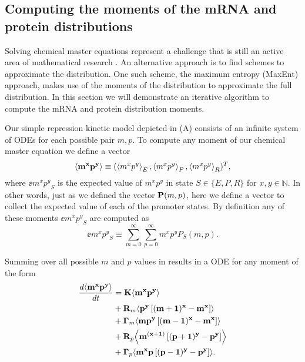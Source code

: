 \subsection{Computing the moments of the mRNA and protein distributions}
\label{sec_moments}

Solving chemical master equations represent a challenge that is still an active
area of mathematical research \cite{Dinh2016}. An alternative approach is to
find schemes to approximate the distribution. One such scheme, the maximum
entropy (MaxEnt) approach, makes use of the moments of the distribution to
approximate the full distribution. In this section we will demonstrate an
iterative algorithm to compute the mRNA and protein distribution moments.

Our simple repression kinetic model depicted in (A)
consists of an infinite system of ODEs for each possible pair $m, p$. To
compute any moment of our chemical master equation we define a vector
\begin{equation}
	\left\langle \mathbf{m^x p^y} \right\rangle \equiv (\left\langle m^x p^y \right\rangle_E, \left\langle m^x p^y \right\rangle_P, \left\langle m^x p^y \right\rangle_R)^T,
\end{equation}
where $\ee{m^x p^y}_S$ is the expected value of $m^x p^y$ in state $S \in \{E,
P, R\}$ for $x, y \in \mathbb{N}$. In other words, just as we defined the vector
$\mathbf{P}(m, p)$, here we define a vector to collect the expected value of each of
the promoter states. By definition any of these moments $\ee{m^x p^y}_S$ are
computed as
\begin{equation}
  \ee{m^x p^y}_S \equiv \sum_{m=0}^\infty \sum_{p=0}^\infty m^x p^y P_S(m, p).
  \label{eq_mom_def}
\end{equation}

Summing over all possible $m$ and $p$ values in  results in
a ODE for any moment of the form 
\begin{equation}
  \begin{aligned}
    {d{\mathbf{\left\langle m^x p^y \right\rangle}} \over dt} &=
    \mathbf{K} \mathbf{\left\langle m^x p^y \right\rangle}\\
    &+ \mathbf{R}_m \mathbf{\left\langle p^y \left[ (m + 1)^x -m^x \right] \right\rangle}\\
    &+ \mathbf{\Gamma}_m \mathbf{\left\langle m p^y \left[ (m - 1)^x - m^x \right] \right\rangle}\\
    &+ \mathbf{R}_p \mathbf{\left\langle m^{(x + 1)} \left[ (p + 1)^y - p^y \right] \right\rangle}\\
    &+ \mathbf{\Gamma}_p \mathbf{\left\langle m^x p \left[ (p - 1)^y - p^y \right] \right\rangle}.
    \label{eq_gral_mom}
  \end{aligned}
\end{equation}

